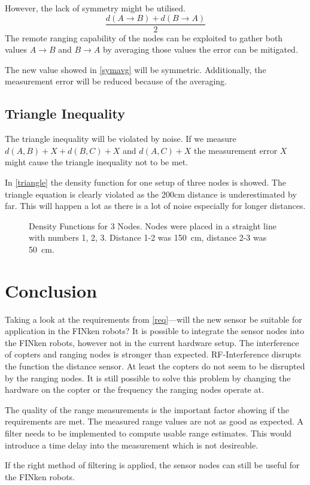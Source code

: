 However, the lack of symmetry might be utilised.
\begin{equation}
\frac{ d(A \rightarrow B) + d(B \rightarrow A) }{2}
\label{symavg}
\end{equation}
The remote ranging capability of the nodes can be exploited to gather both values $A \rightarrow B$ and $B \rightarrow A$ by averaging those values the error can be mitigated.

The new value showed in \autoref{symavg} will be symmetric.
Additionally, the measurement error will be reduced because of the averaging.

\subsection{Triangle Inequality}
The triangle inequality will be violated by noise.
If we measure $d(A,B) + X + d(B,C) + X$ and $d(A, C) + X$ the measurement error $X$ might cause the triangle inequality not to be met.

In \autoref{triangle} the density function for one setup of three nodes is showed.
The triangle equation is clearly violated as the \si{200}{cm} distance is underestimated by far.
This will happen a lot as there is a lot of noise especially for longer distances.
\begin{figure}[H]
	\centering
	
	\caption[Density Functions for 3 Nodes]{Density Functions for 3 Nodes. Nodes were placed in a straight line with numbers 1, 2, 3. Distance 1-2 was \SI{150}{cm}, distance 2-3 was \SI{50}{cm}. }
	\label{triangle}
\end{figure}


\section{Conclusion}
\label{evalconclusio}
Taking a look at the requirements from \autoref{req}—will the new sensor be suitable for application in the FINken robots?
It is possible to integrate the sensor nodes into the FINken robots, however not in the current hardware setup.
The interference of copters and ranging nodes is stronger than expected.
RF-Interference disrupts the function the distance sensor.
At least the copters do not seem to be disrupted by the ranging nodes.
It is still possible to solve this problem by changing the hardware on the copter or the frequency the ranging nodes operate at.

The quality of the range measurements is the important factor showing if the requirements are met.
The measured range values are not as good as expected.
A filter needs to be implemented to compute usable range estimates.
This would introduce a time delay into the measurement which is not desireable.

If the right method of filtering is applied, the sensor nodes can still be useful for the FINken robots.
